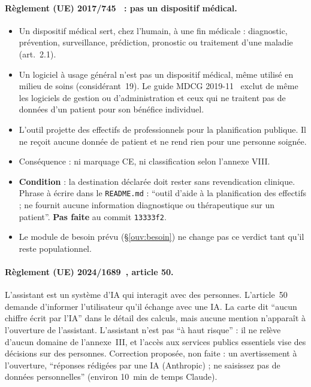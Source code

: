 \paragraph{Règlement (UE) 2017/745~\citep{e-mdr} : pas un dispositif médical\derive{}.}
\begin{itemize}
\item Un dispositif médical sert, chez l'humain, à une fin médicale : diagnostic, prévention, surveillance, prédiction, pronostic ou traitement d'une maladie (art.~2.1).
\item Un logiciel à usage général n'est pas un dispositif médical, même utilisé en milieu de soins (considérant~19). Le guide MDCG 2019-11~\citep{e-mdcg} exclut de même les logiciels de gestion ou d'administration et ceux qui ne traitent pas de données d'un patient pour son bénéfice individuel.
\item L'outil projette des effectifs de professionnels pour la planification publique. Il ne reçoit aucune donnée de patient et ne rend rien pour une personne soignée.
\item Conséquence : ni marquage CE, ni classification selon l'annexe VIII.
\item \textbf{Condition} : la destination déclarée doit rester sans revendication clinique. Phrase à écrire dans le \texttt{README.md} : \enquote{outil d'aide à la planification des effectifs ; ne fournit aucune information diagnostique ou thérapeutique sur un patient}. \textbf{Pas faite} au commit \texttt{13333f2}.
\item Le module de besoin prévu (§\ref{ouv:besoin}) ne change pas ce verdict tant qu'il reste populationnel.
\end{itemize}

\paragraph{Règlement (UE) 2024/1689~\citep{e-aiact}, article 50.}
L'assistant est un système d'IA qui interagit avec des personnes. L'article~50 demande d'informer l'utilisateur qu'il échange avec une IA.
La carte dit \enquote{aucun chiffre écrit par l'IA} dans le détail des calculs, mais aucune mention n'apparaît à l'ouverture de l'assistant.
L'assistant n'est pas \enquote{à haut risque}\derive{} : il ne relève d'aucun domaine de l'annexe~III, et l'accès aux services publics essentiels vise des décisions sur des personnes.
Correction proposée, non faite : un avertissement à l'ouverture, \enquote{réponses rédigées par une IA (Anthropic) ; ne saisissez pas de données personnelles} (environ 10\suppose{}~min de temps Claude).

